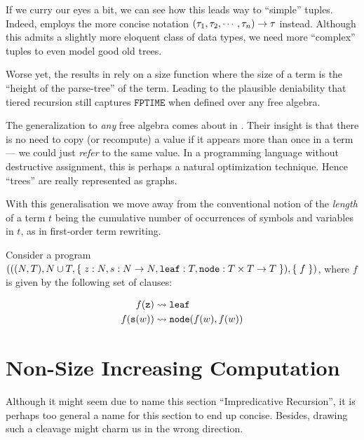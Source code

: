 If we curry our eyes a bit, we can see how this leads way to ``simple'' tuples.
Indeed, \cite{marion-2003} employs the more concise notation
${\mathopen{}\left({\tau_1,\tau_2,\cdots,\tau_n}\right)\mathclose{}}\rightarrow \tau$ instead.  Although this
admits a slightly more eloquent class of data types, we need more ``complex''
tuples to even model good old trees.

Worse yet, the results in \cite{leivant-1995} rely on a size function where the
size of a term is the ``height of the parse-tree'' of the term. Leading to the
plausible deniability that tiered recursion still captures $\mathtt{FPTIME}$
when defined over any free algebra\cite{caseiro-1996}.

The generalization to \emph{any} free algebra comes about in
\cite{dal-lago-et-al-2010}. Their insight is that there is no need to copy (or
recompute) a value if it appears more than once in a term --- we could just
\emph{refer} to the same value. In a programming language without destructive
assignment, this is perhaps a natural optimization technique. Hence ``trees''
are really represented as graphs.

\begin{remark} With this generalisation we move away from the conventional
notion of the \emph{length} of a term $t$ being the cumulative number of
occurrences of symbols and variables in $t$, as in first-order term
rewriting\cite{klop-vrijer-2003}. \end{remark}

\begin{example} \cite{dal-lago-et-al-2003} Consider a program ${\mathopen{}\left({{\mathopen{}\left({{\mathopen{}\left({N,T}\right)\mathclose{}}, N
\cup T, \mathopen{}\left\{\mathrel{}{z : N, s : N \rightarrow N, \mathtt{leaf} : T, \mathtt{node} : T
\times T \rightarrow T}\mathrel{}\right\}\mathclose{}}\right)\mathclose{}}, \mathopen{}\left\{\mathrel{}{f}\mathrel{}\right\}\mathclose{}}\right)\mathclose{}}$, where $f$ is given by the following set of
clauses:

\begin{align}
f{\mathopen{}\left({\mathtt{z}}\right)\mathclose{}}       &\leadsto \mathtt{leaf} \\
f{\mathopen{}\left({\mathtt{s}{\mathopen{}\left({w}\right)\mathclose{}}}\right)\mathclose{}}  &\leadsto \mathtt{node}{\mathopen{}\left({f{\mathopen{}\left({w}\right)\mathclose{}}, f{\mathopen{}\left({w}\right)\mathclose{}}}\right)\mathclose{}}
\end{align}

\end{example}

\section{Non-Size Increasing Computation}

Although it might seem due to name this section ``Impredicative Recursion'', it
is perhaps too general a name for this section to end up concise. Besides,
drawing such a cleavage might charm us in the wrong direction.

